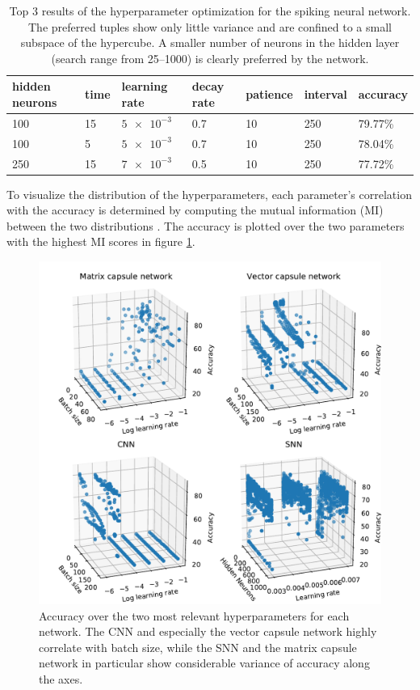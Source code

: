 \begin{table}[H]
\centering
\begin{tabular}{@{}lllllll@{}}
\toprule
hidden neurons & time & learning rate & decay rate & patience & interval & accuracy \\ \midrule
100            & 15   & $\num{5e-3}$  & 0.7        & 10       & 250      & 79.77\%  \\
100            & 5    & $\num{5e-3}$  & 0.7        & 10       & 250      & 78.04\%  \\
250            & 15    & $\num{7e-3}$  & 0.5        & 10       & 250      & 77.72\%  \\ \bottomrule
\end{tabular}
\caption[Top 3 results of the hyperparameter optimization for the spiking neural network]{Top 3 results of the hyperparameter optimization for the spiking neural network. The preferred tuples show only little variance and are confined to a small subspace of the hypercube. A smaller number of neurons in the hidden layer (search range from 25--1000) is clearly preferred by the network.}
\label{tab:bindsnet-best}
\end{table}\noindent
To visualize the distribution of the hyperparameters, each parameter's correlation with the accuracy is determined by computing the mutual information (MI) between the two distributions \cite{kraskov2004estimating}. The accuracy is plotted over the two parameters with the highest MI scores in figure \ref{fig:hyperparameters}.
\begin{figure}[H]
    \centering
\includegraphics[clip,trim=0 0 0 .65cm,width=.79\textwidth]{figures/hyperparameters.pdf}
\caption[Accuracy over the two most relevant hyperparameters for each network]{Accuracy over the two most relevant hyperparameters for each network. The CNN and especially the vector capsule network highly correlate with batch size, while the SNN and the matrix capsule network in particular show considerable variance of accuracy along the axes.}\label{fig:hyperparameters}
\end{figure}\noindent
